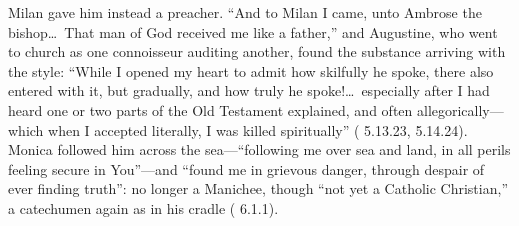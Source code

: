Milan gave him instead a preacher. ``And to Milan I came, unto Ambrose the
bishop\ldots\ That man of God received me like a father,'' and Augustine, who
went to church as one connoisseur auditing another, found the substance
arriving with the style: ``While I opened my heart to admit how skilfully he
spoke, there also entered with it, but gradually, and how truly he
spoke!\ldots\ especially after I had heard one or two parts of the Old
Testament explained, and often allegorically---which when I accepted
literally, I was killed spiritually'' ( 5.13.23,
5.14.24). Monica followed him across the sea---``following me over sea and
land, in all perils feeling secure in You''---and ``found me in grievous
danger, through despair of ever finding truth'': no longer a Manichee,
though ``not yet a Catholic Christian,'' a catechumen again as in his cradle
( 6.1.1).
